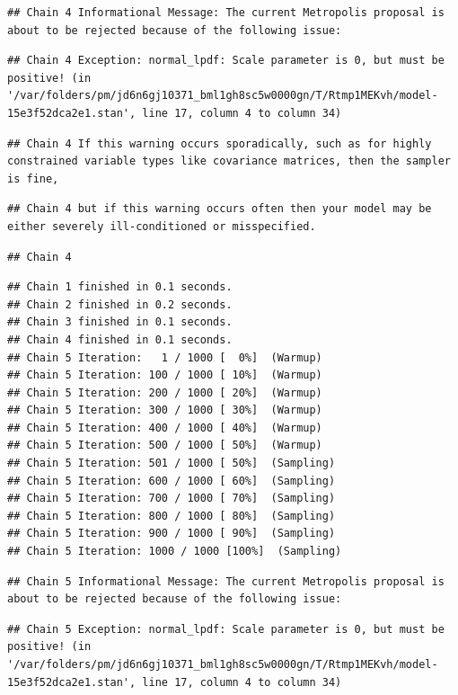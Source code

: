 \documentclass[
]{book}
\begin{document}
\begin{verbatim}
## Chain 4 Informational Message: The current Metropolis proposal is about to be rejected because of the following issue:
\end{verbatim}

\begin{verbatim}
## Chain 4 Exception: normal_lpdf: Scale parameter is 0, but must be positive! (in '/var/folders/pm/jd6n6gj10371_bml1gh8sc5w0000gn/T/Rtmp1MEKvh/model-15e3f52dca2e1.stan', line 17, column 4 to column 34)
\end{verbatim}

\begin{verbatim}
## Chain 4 If this warning occurs sporadically, such as for highly constrained variable types like covariance matrices, then the sampler is fine,
\end{verbatim}

\begin{verbatim}
## Chain 4 but if this warning occurs often then your model may be either severely ill-conditioned or misspecified.
\end{verbatim}

\begin{verbatim}
## Chain 4
\end{verbatim}

\begin{verbatim}
## Chain 1 finished in 0.1 seconds.
## Chain 2 finished in 0.2 seconds.
## Chain 3 finished in 0.1 seconds.
## Chain 4 finished in 0.1 seconds.
## Chain 5 Iteration:   1 / 1000 [  0%]  (Warmup) 
## Chain 5 Iteration: 100 / 1000 [ 10%]  (Warmup) 
## Chain 5 Iteration: 200 / 1000 [ 20%]  (Warmup) 
## Chain 5 Iteration: 300 / 1000 [ 30%]  (Warmup) 
## Chain 5 Iteration: 400 / 1000 [ 40%]  (Warmup) 
## Chain 5 Iteration: 500 / 1000 [ 50%]  (Warmup) 
## Chain 5 Iteration: 501 / 1000 [ 50%]  (Sampling) 
## Chain 5 Iteration: 600 / 1000 [ 60%]  (Sampling) 
## Chain 5 Iteration: 700 / 1000 [ 70%]  (Sampling) 
## Chain 5 Iteration: 800 / 1000 [ 80%]  (Sampling) 
## Chain 5 Iteration: 900 / 1000 [ 90%]  (Sampling) 
## Chain 5 Iteration: 1000 / 1000 [100%]  (Sampling)
\end{verbatim}

\begin{verbatim}
## Chain 5 Informational Message: The current Metropolis proposal is about to be rejected because of the following issue:
\end{verbatim}

\begin{verbatim}
## Chain 5 Exception: normal_lpdf: Scale parameter is 0, but must be positive! (in '/var/folders/pm/jd6n6gj10371_bml1gh8sc5w0000gn/T/Rtmp1MEKvh/model-15e3f52dca2e1.stan', line 17, column 4 to column 34)
\end{verbatim}
\end{document}
